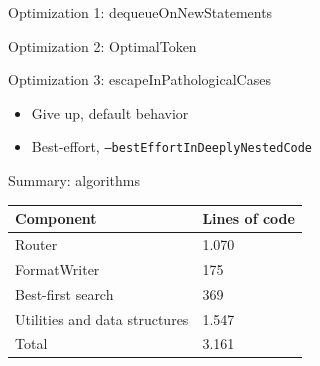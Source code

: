 \documentclass[xcolor=dvipsnames]{beamer}
\theoremstyle{definition}
\begin{document}
\begin{frame}{Optimization 1: dequeueOnNewStatements}
  
\end{frame}

\begin{frame}{Optimization 2: OptimalToken}
  
\end{frame}

\begin{frame}{Optimization 3: escapeInPathologicalCases}
  \begin{itemize}
    \item Give up, default behavior
    \item Best-effort, \texttt{--bestEffortInDeeplyNestedCode}
  \end{itemize}
  
\end{frame}

%   
%
%   

\begin{frame}{Summary: algorithms}
  \begin{table}[H]
    \centering
    \label{}
    \begin{tabular}{ll}
      Component & Lines of code \\
      \hline \hline
      Router & 1.070 \\
      FormatWriter & 175 \\
      Best-first search & 369 \\
      Utilities and data structures & 1.547 \\
      \hline
      Total & 3.161
    \end{tabular}
  \end{table}
\end{frame}
\end{document}
